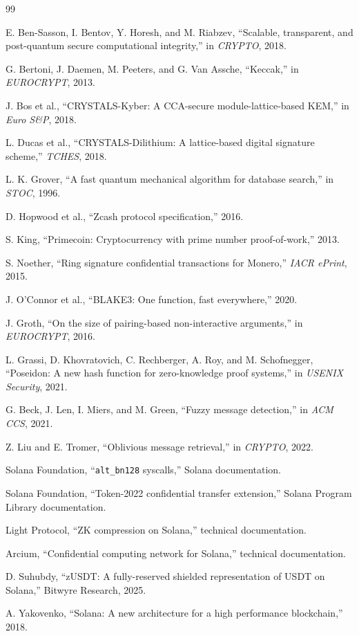 \documentclass[11pt,a4paper]{article}
\begin{document}

\begin{thebibliography}{99}

E. Ben-Sasson, I. Bentov, Y. Horesh, and M. Riabzev, ``Scalable, transparent, and post-quantum secure computational integrity,'' in \textit{CRYPTO}, 2018.

G. Bertoni, J. Daemen, M. Peeters, and G. Van Assche, ``Keccak,'' in \textit{EUROCRYPT}, 2013.

J. Bos et al., ``CRYSTALS-Kyber: A CCA-secure module-lattice-based KEM,'' in \textit{Euro S\&P}, 2018.



L. Ducas et al., ``CRYSTALS-Dilithium: A lattice-based digital signature scheme,'' \textit{TCHES}, 2018.


L. K. Grover, ``A fast quantum mechanical algorithm for database search,'' in \textit{STOC}, 1996.

D. Hopwood et al., ``Zcash protocol specification,'' 2016.


S. King, ``Primecoin: Cryptocurrency with prime number proof-of-work,'' 2013.




S. Noether, ``Ring signature confidential transactions for Monero,'' \textit{IACR ePrint}, 2015.

J. O'Connor et al., ``BLAKE3: One function, fast everywhere,'' 2020.

J. Groth, ``On the size of pairing-based non-interactive arguments,'' in \textit{EUROCRYPT}, 2016.

L. Grassi, D. Khovratovich, C. Rechberger, A. Roy, and M. Schofnegger, ``Poseidon: A new hash function for zero-knowledge proof systems,'' in \textit{USENIX Security}, 2021.

G. Beck, J. Len, I. Miers, and M. Green, ``Fuzzy message detection,'' in \textit{ACM CCS}, 2021.

Z. Liu and E. Tromer, ``Oblivious message retrieval,'' in \textit{CRYPTO}, 2022.

Solana Foundation, ``\texttt{alt\_bn128} syscalls,'' Solana documentation.

Solana Foundation, ``Token-2022 confidential transfer extension,'' Solana Program Library documentation.

Light Protocol, ``ZK compression on Solana,'' technical documentation.

Arcium, ``Confidential computing network for Solana,'' technical documentation.

D. Suhubdy, ``zUSDT: A fully-reserved shielded representation of USDT on Solana,'' Bitwyre Research, 2025.


A. Yakovenko, ``Solana: A new architecture for a high performance blockchain,'' 2018.


\end{thebibliography}
\end{document}

